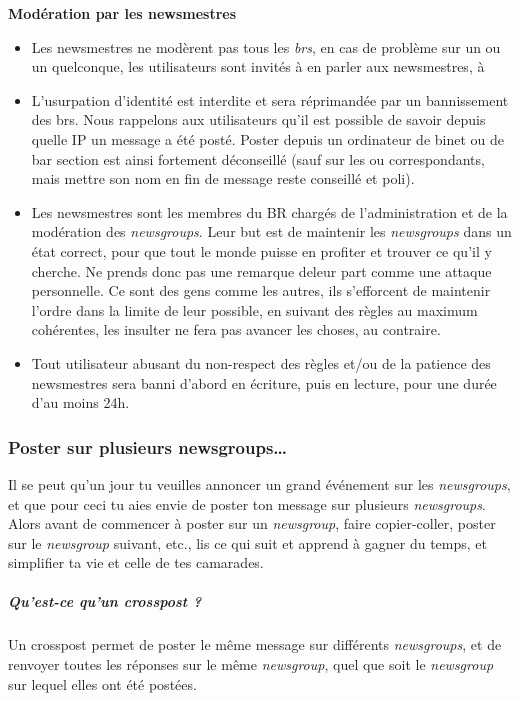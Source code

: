 \textbf{Modération par les newsmestres}
\begin{itemize}
 \item Les newsmestres ne modèrent pas tous les \emph{brs}, en cas de problème sur un  ou un  quelconque, les utilisateurs sont invités à en parler aux newsmestres, à 
 \item L'usurpation d'identité est interdite et sera réprimandée par un bannissement des brs. Nous rappelons aux utilisateurs qu'il est possible de savoir depuis quelle IP un message a été posté. Poster depuis un ordinateur de binet ou de bar section est ainsi fortement déconseillé (sauf sur les  ou  correspondants, mais mettre son nom en fin de message reste conseillé et poli).
 \item Les newsmestres sont les membres du BR chargés de l'administration et de la modération des \emph{newsgroups}. Leur but est de maintenir les \emph{newsgroups} dans un état correct, pour que tout le monde puisse en profiter et trouver ce qu'il y cherche. Ne prends donc pas une remarque deleur part comme une attaque personnelle. Ce sont des gens comme les autres, ils s'efforcent de maintenir l'ordre dans la limite de leur possible, en suivant des règles au maximum cohérentes, les insulter ne fera pas avancer les choses, au contraire.
 \item Tout utilisateur abusant du non-respect des règles et/ou de la patience des newsmestres sera banni d'abord en écriture, puis en lecture, pour une durée d'au moins 24h.
\end{itemize}


\subsubsection{Poster sur plusieurs newsgroups\dots }



Il se peut qu'un jour tu veuilles annoncer un grand événement sur les \emph{newsgroups}, et que pour ceci tu aies envie de poster ton message sur
plusieurs \emph{newsgroups}. Alors avant de commencer à poster sur un \emph{newsgroup}, faire copier-coller, poster sur le \emph{newsgroup} suivant,
etc., lis ce qui suit et apprend à gagner du temps, et simplifier ta vie et celle de tes camarades.

\subparagraph{Qu'est-ce qu'un crosspost ?}
Un crosspost permet de poster le même message sur différents \emph{newsgroups}, et de renvoyer toutes les réponses sur le même \emph{newsgroup}, quel
que soit le \emph{newsgroup} sur lequel elles ont été postées.

